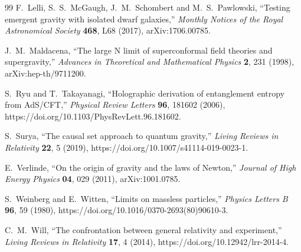 \documentclass[11pt,a4paper]{article}
\theoremstyle{remark}
\begin{document}
\begin{thebibliography}{99}
F.~Lelli, S.~S.~McGaugh, J.~M.~Schombert and M.~S.~Pawlowski, ``Testing emergent
gravity with isolated dwarf galaxies,'' \emph{Monthly Notices of the Royal
Astronomical Society} \textbf{468}, L68 (2017), arXiv:1706.00785.

J.~M.~Maldacena, ``The large N limit of superconformal field theories and
supergravity,'' \emph{Advances in Theoretical and Mathematical Physics}
\textbf{2}, 231 (1998), arXiv:hep-th/9711200.

S.~Ryu and T.~Takayanagi, ``Holographic derivation of entanglement entropy from
AdS/CFT,'' \emph{Physical Review Letters} \textbf{96}, 181602 (2006),
https://doi.org/10.1103/PhysRevLett.96.181602.

S.~Surya, ``The causal set approach to quantum gravity,'' \emph{Living Reviews
in Relativity} \textbf{22}, 5 (2019),
https://doi.org/10.1007/s41114-019-0023-1.

E.~Verlinde, ``On the origin of gravity and the laws of Newton,'' \emph{Journal
of High Energy Physics} \textbf{04}, 029 (2011), arXiv:1001.0785.

S.~Weinberg and E.~Witten, ``Limits on massless particles,'' \emph{Physics
Letters B} \textbf{96}, 59 (1980),
https://doi.org/10.1016/0370-2693(80)90610-3.

C.~M.~Will, ``The confrontation between general relativity and experiment,''
\emph{Living Reviews in Relativity} \textbf{17}, 4 (2014),
https://doi.org/10.12942/lrr-2014-4.
\end{thebibliography}
\end{document}

